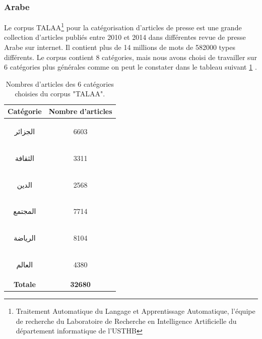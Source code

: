     \subsubsection{Arabe}
    Le corpus TALAA\footnote{Traitement Automatique du Langage et Apprentissage Automatique, l'équipe de recherche du Laboratoire de Recherche en Intelligence Artificielle du département informatique de l'USTHB} pour la catégorisation d'articles de presse est une grande collection d'articles publiés entre 2010 et 2014 dans différentes revue de presse Arabe sur internet. Il contient plus de 14 millions de mots de 582000 types différents. Le corpus contient 8 catégories, mais nous avons choisi de travailler sur 6 catégories plus générales comme on peut le constater dans le tableau suivant \ref{talaa-categ} \cite{talaa}. 
    \begin{table}[H]
        \begin{center}
            \begin{tabular}{|c|c|}
                \hline
                \textbf{Catégorie} &  \textbf{Nombre d'articles} \\
                \hline
                \begin{arab}الجزائر\end{arab} & 6603 \\
                \begin{arab}الثقافة\end{arab} & 3311 \\
                \begin{arab}الدين\end{arab} & 2568 \\
                \begin{arab}المجتمع\end{arab} & 7714 \\
                \begin{arab}الرياضة\end{arab} & 8104 \\
                \begin{arab}العالم\end{arab} & 4380 \\
                \textbf{Totale} & \textbf{32680} \\
                \hline
            \end{tabular}
        \end{center}
        \caption{Nombres d'articles des 6 catégories choisies du corpus "TALAA".}
        \label{talaa-categ}
    \end{table}

